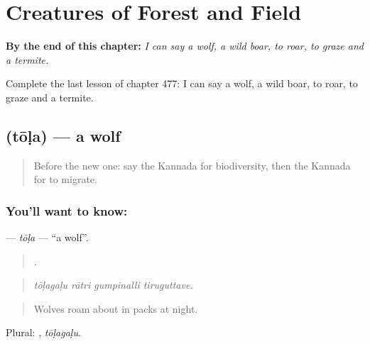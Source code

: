 
\chapter{Creatures of Forest and Field}
\label{ch:ka-creatures-of-forest-and-field}

\begin{chapteropening}
\textbf{By the end of this chapter:} \emph{I can say a wolf, a wild boar, to roar, to graze and a termite.}

Complete the last lesson of chapter 477: I can say a wolf, a wild boar, to roar, to graze and a termite.
\end{chapteropening}

\section[\texorpdfstring{\kn{ತೋಳ} (tōḷa)}{ತೋಳ (tōḷa)}]{ (tōḷa) — a wolf}

\label{lesson:KA-C477-tola}



\begin{quote}
Before the new one: say the Kannada for biodiversity, then the Kannada for to migrate.
\end{quote}

\subsection*{You'll want to know: }
\textbf{} — \emph{tōḷa} — \textquotedblleft{}a wolf\textquotedblright{}.

\begin{quote}
   .
\end{quote}

\begin{quote}
\emph{tōḷagaḷu rātri gumpinalli tiruguttave.}
\end{quote}

\begin{quote}
Wolves roam about in packs at night.
\end{quote}

Plural: , \emph{tōḷagaḷu}.


